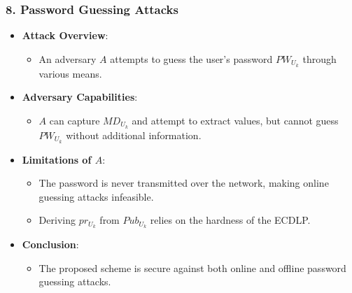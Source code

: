 \documentclass[9pt,handout]{beamer}
\begin{document}
\begin{frame}
    \frametitle{8. Password Guessing Attacks}
    \begin{itemize}
        \item \textbf{Attack Overview}:
            \begin{itemize}
                \item An adversary \( A \) attempts to guess the user’s password \( PW_{U_k} \) through various means.
            \end{itemize}
        \item \textbf{Adversary Capabilities}:
            \begin{itemize}
                \item \( A \) can capture \( MD_{U_k} \) and attempt to extract values, but cannot guess \( PW_{U_k} \) without additional information.
            \end{itemize}
        \item \textbf{Limitations of \( A \)}:
            \begin{itemize}
                \item The password is never transmitted over the network, making online guessing attacks infeasible.
                \item Deriving \( pr_{U_k} \) from \( Pub_{U_k} \) relies on the hardness of the ECDLP.
            \end{itemize}
        \item \textbf{Conclusion}:
            \begin{itemize}
                \item The proposed scheme is secure against both online and offline password guessing attacks.
            \end{itemize}
    \end{itemize}
\end{frame}
\end{document}
